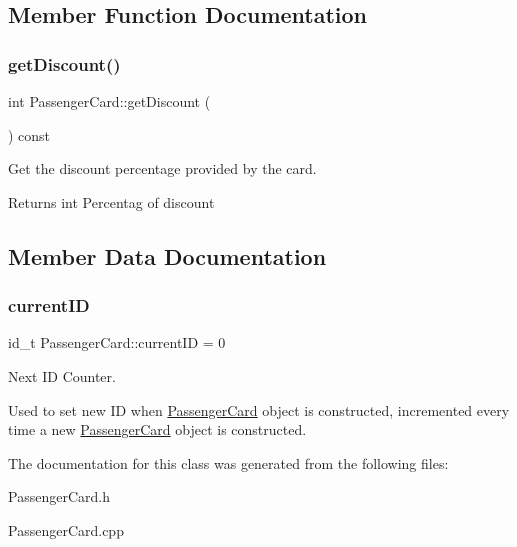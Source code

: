 \subsection{Member Function Documentation}
\mbox{\label{classPassengerCard_a62d2651d233d28643d5e0863500c42c4}} 
\subsubsection{\texorpdfstring{get\+Discount()}{getDiscount()}}
{\footnotesize\ttfamily int Passenger\+Card\+::get\+Discount (\begin{DoxyParamCaption}{ }\end{DoxyParamCaption}) const}



Get the discount percentage provided by the card. 

\begin{DoxyReturn}{Returns}
int Percentag of discount 
\end{DoxyReturn}


\subsection{Member Data Documentation}
\mbox{\label{classPassengerCard_af557a01fde14b95c0e0b355e777e2aec}} 
\subsubsection{\texorpdfstring{current\+ID}{currentID}}
{\footnotesize\ttfamily id\+\_\+t Passenger\+Card\+::current\+ID = 0\hspace{0.3cm}{\ttfamily [static]}}



Next ID Counter. 

Used to set new ID when \mbox{\hyperlink{classPassengerCard}{Passenger\+Card}} object is constructed, incremented every time a new \mbox{\hyperlink{classPassengerCard}{Passenger\+Card}} object is constructed. 

The documentation for this class was generated from the following files\+:\begin{DoxyCompactItemize}
\item 
Passenger\+Card.\+h\item 
Passenger\+Card.\+cpp\end{DoxyCompactItemize}
